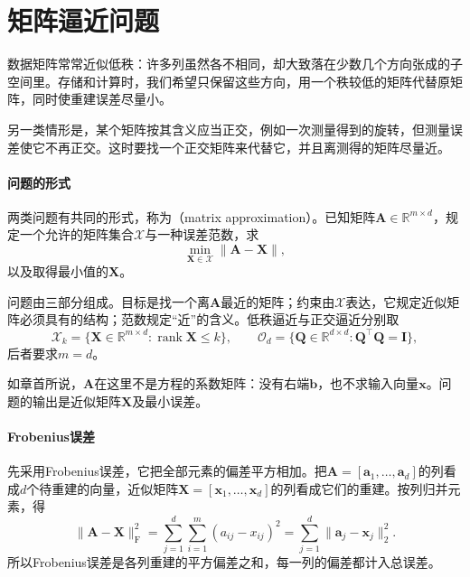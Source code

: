 
\section{矩阵逼近问题}
\label{sec:matrix-approximation-problem}

数据矩阵常常近似低秩：许多列虽然各不相同，却大致落在少数几个方向张成的子空间里。存储和计算时，我们希望只保留这些方向，用一个秩较低的矩阵代替原矩阵，同时使重建误差尽量小。

另一类情形是，某个矩阵按其含义应当正交，例如一次测量得到的旋转，但测量误差使它不再正交。这时要找一个正交矩阵来代替它，并且离测得的矩阵尽量近。

\paragraph{问题的形式}
两类问题有共同的形式，称为（matrix approximation）。已知矩阵$\bm A\in\mathbb R^{m\times d}$，规定一个允许的矩阵集合$\mathcal X$与一种误差范数，求
\begin{equation}
 \min_{\bm X\in\mathcal X}\lVert\bm A-\bm X\rVert ,
 \label{eq:matrix-approximation-problem}
\end{equation}
以及取得最小值的$\bm X$。

问题由三部分组成。目标是找一个离$\bm A$最近的矩阵；约束由$\mathcal X$表达，它规定近似矩阵必须具有的结构；范数规定“近”的含义。低秩逼近与正交逼近分别取
\begin{equation}
 \mathcal X_k=\{\bm X\in\mathbb R^{m\times d}:\operatorname{rank}\bm X\leq k\},\qquad
 \mathcal O_d=\{\bm Q\in\mathbb R^{d\times d}:\bm Q^\top\bm Q=\bm I\},
 \label{eq:matrix-approximation-constraint-sets}
\end{equation}
后者要求$m=d$。

如章首所说，$\bm A$在这里不是方程的系数矩阵：没有右端$\bm b$，也不求输入向量$\bm x$。问题的输出是近似矩阵$\bm X$及最小误差。

\paragraph{Frobenius误差}
先采用Frobenius误差，它把全部元素的偏差平方相加。把$\bm A=[\bm a_1,\ldots,\bm a_d]$的列看成$d$个待重建的向量，近似矩阵$\bm X=[\bm x_1,\ldots,\bm x_d]$的列看成它们的重建。按列归并元素，得
\begin{equation}
 \lVert\bm A-\bm X\rVert_{\mathrm F}^2
 =\sum_{j=1}^d\sum_{i=1}^m(a_{ij}-x_{ij})^2
 =\sum_{j=1}^d\lVert\bm a_j-\bm x_j\rVert_2^2 .
 \label{eq:matrix-approximation-frobenius-columns}
\end{equation}
所以Frobenius误差是各列重建的平方偏差之和，每一列的偏差都计入总误差。

